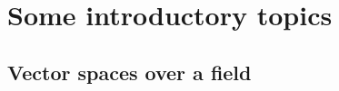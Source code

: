 \clearpage{\thispagestyle{empty}}
\section{Some introductory topics}
\subsection{Vector spaces over a field}

%
%	
	
	
